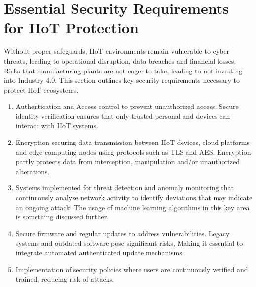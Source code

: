 \documentclass[article,a4paper]{IEEEtran}
\begin{document}
\section{Essential Security Requirements for IIoT Protection}
Without proper safeguards, IIoT environments remain vulnerable to cyber threats, leading to operational disruption, data breaches and financial losses. Risks that manufacturing plants are not eager to take, leading to not investing into Industry 4.0. This section outlines key security requirements necessary to protect IIoT ecosystems.
\newline 
\begin{enumerate}
    \item Authentication and Access control to prevent unauthorized access. Secure identity verification ensures that only trusted personal and devices can interact with IIoT systems. 
    \item Encryption securing data transmission between IIoT devices, cloud platforms and edge computing nodes using protocols such as TLS and AES. Encryption partly protects data from interception, manipulation and/or unauthorized alterations. 
    \item Systems implemented for threat detection and anomaly monitoring that continuously analyze network activity to identify deviations that may indicate an ongoing attack. The usage of machine learning algorithms in this key area is something discussed further.  
    \item Secure firmware and regular updates to address vulnerabilities. Legacy systems and outdated software pose significant risks, Making it essential to integrate automated authenticated update mechanisms. 
    \item Implementation of security policies where users are continuously verified and trained, reducing risk of attacks. 
\end{enumerate}
\end{document}
